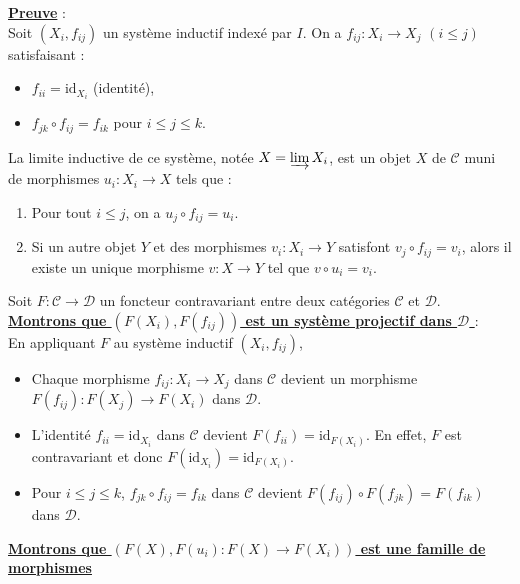 \documentclass[a4paper, 14pt]{report}
\begin{document}
\begin{onehalfspace}
{	
\textbf{\underline{Preuve}} : \\

Soit \( (X_i, f_{ij}) \) un syst\`eme inductif  index\'e par \( I \). On a \( f_{ij}: X_i \to X_j \)  \( (i \leq j  )\) satisfaisant :
\begin{itemize}
	\item \( f_{ii} = \text{id}_{X_i} \) (identit\'e),
	\item \( f_{jk} \circ f_{ij} = f_{ik} \) pour \( i \leq j \leq k \).
\end{itemize}

La limite inductive de ce syst\`eme, not\'ee \( X = \varinjlim X_i \), est un objet $X$ de  \( \mathcal{C} \) muni de morphismes \( u_i: X_i \to X \) tels que :
\begin{enumerate}
	\item Pour tout \( i \leq j \), on a \( u_j \circ f_{ij} = u_i \).
	\item Si un autre objet \( Y \) et des morphismes \( v_i: X_i \to Y \) satisfont \( v_j \circ f_{ij} = v_i \), alors il existe un unique morphisme \( v: X \to Y \) tel que \( v \circ u_i = v_i \).
\end{enumerate}

Soit \( F: \mathcal{C} \to \mathcal{D} \) un foncteur contravariant entre deux cat\'egories \( \mathcal{C} \) et \( \mathcal{D} \). \\

\textbf{\underline{Montrons que \( (F(X_i), F(f_{ij}) ) \) est un système projectif dans \( \mathcal{D} \) }}: \\

En appliquant \( F \) au système inductif \( (X_i, f_{ij}) \),  
\begin{itemize}
	\item Chaque morphisme \( f_{ij}: X_i \to X_j \) dans \( \mathcal{C} \) devient un morphisme \\
	\( F(f_{ij}): F(X_j) \to F(X_i) \) dans \( \mathcal{D} \).
	\item L'identité \( f_{ii} = \text{id}_{X_i} \) dans \( \mathcal{C} \) devient \( F(f_{ii}) = \text{id}_{F(X_i)} \). En effet, \( F \) est contravariant et donc \( F(\text{id}_{X_i}) = \text{id}_{F(X_i)} \).
	\item Pour \( i \leq j \leq k \), \( f_{jk} \circ f_{ij} = f_{ik} \) dans \( \mathcal{C} \) devient \( F(f_{ij}) \circ F(f_{jk}) = F(f_{ik}) \) dans \( \mathcal{D} \).
\end{itemize}

\textbf{\underline{Montrons que \( (F(X), F(u_{i}) : F(X) \to F(X_i) ) \) est une famille de morphismes }} \\

}
\end{onehalfspace}
\end{document}
